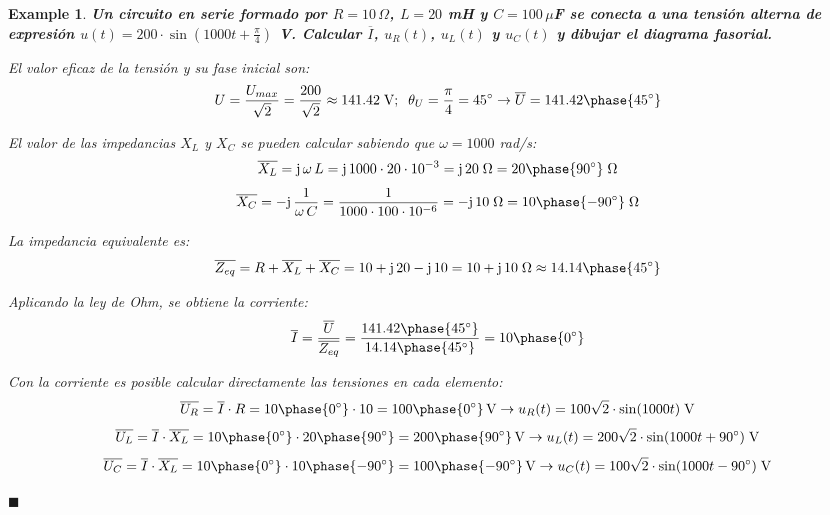\documentclass[11pt]{book} %
\numberwithin{dummy}{section}
\theoremstyle{ocrenumbox}
\theoremstyle{blacknumex}
\newtheorem{exampleT}{Example}[chapter]
\theoremstyle{blacknumbox}
\theoremstyle{ocrenum}
\newenvironment{example}{\begin{exampleT}}{\hfill{\tiny\ensuremath{\blacksquare}}\end{exampleT}}
\begin{document}
	\vspace{4mm}
	\begin{example}\label{ej.2-3}
		\textbf{Un circuito en serie formado por $R=10\,\Omega$, $L=20$ mH y $C=100\,\mu$F se conecta a una tensión alterna de expresión $u(t)=200\cdot\sin(1000t+\frac{\pi}{4})$ V. Calcular $\overline{I}$, ${u_R(t)}$, $u_L(t)$ y $u_C(t)$ y dibujar el diagrama fasorial.}
		
		El valor eficaz de la tensión y su fase inicial son:
		\begin{equation*}
			U=\dfrac{U_{max}}{\sqrt{2}}=\dfrac{200}{\sqrt{2}}\approx 141.42\;\text{V};\;\;\theta_U=\dfrac{\pi}{4}=45^\circ \rightarrow \overline{U}=141.42\phase{45^\circ}
		\end{equation*}
		
		El valor de las impedancias $X_L$ y $X_C$ se pueden calcular sabiendo que $\omega=1000$ rad/s:
		\begin{equation*}
			\overline{X_L}=\mathrm{j}\,\omega\,L=\mathrm{j}\,1000\cdot20\cdot 10^{-3}= \mathrm{j}\,20\;\Omega=20\phase{90^\circ}\;\Omega
		\end{equation*}
		\begin{equation*}
			\overline{X_C}=-\mathrm{j}\,\dfrac{1}{\omega\,C}=\dfrac{1}{1000\cdot100\cdot 10^{-6}}= -\mathrm{j}\,10\;\Omega=10\phase{-90^\circ}\;\Omega
		\end{equation*}
		
		La impedancia equivalente es:
		\begin{equation*}
			\overline{Z_{eq}}=R+\overline{X_L}+\overline{X_C}=10+\mathrm{j}\,20-\mathrm{j}\,10=10+\mathrm{j}\,10\;\Omega\approx 14.14\phase{45^\circ}
		\end{equation*}
		
		Aplicando la ley de Ohm, se obtiene la corriente:
		\begin{equation*}
			\overline{I}=\dfrac{\overline{U}}{\overline{Z_{eq}}}=\dfrac{141.42\phase{45^\circ}}{14.14\phase{45^\circ}}=10\phase{0^\circ}
		\end{equation*}
		
		Con la corriente es posible calcular directamente las tensiones en cada elemento: 
		\begin{equation*}
			\overline{U_R}=\overline{I}\cdot R=10\phase{0^\circ}\cdot 10=100\phase{0^\circ}\,\text{V}\rightarrow u_R(t)=100\sqrt{2}\cdot\sin(1000t)\;\text{V}
		\end{equation*}
		\begin{equation*}
			\overline{U_L}=\overline{I}\cdot \overline{X_L}=10\phase{0^\circ}\cdot 20\phase{90^\circ}=200\phase{90^\circ}\,\text{V}\rightarrow u_L(t)=200\sqrt{2}\cdot\sin(1000t+90^\circ)\;\text{V}
		\end{equation*}
		\begin{equation*}
			\overline{U_C}=\overline{I}\cdot \overline{X_L}=10\phase{0^\circ}\cdot 10\phase{-90^\circ} =100\phase{-90^\circ}\,\text{V}\rightarrow u_C(t)=100\sqrt{2}\cdot\sin(1000t-90^\circ)\;\text{V}
		\end{equation*}
		

\end{example}
\end{document}
